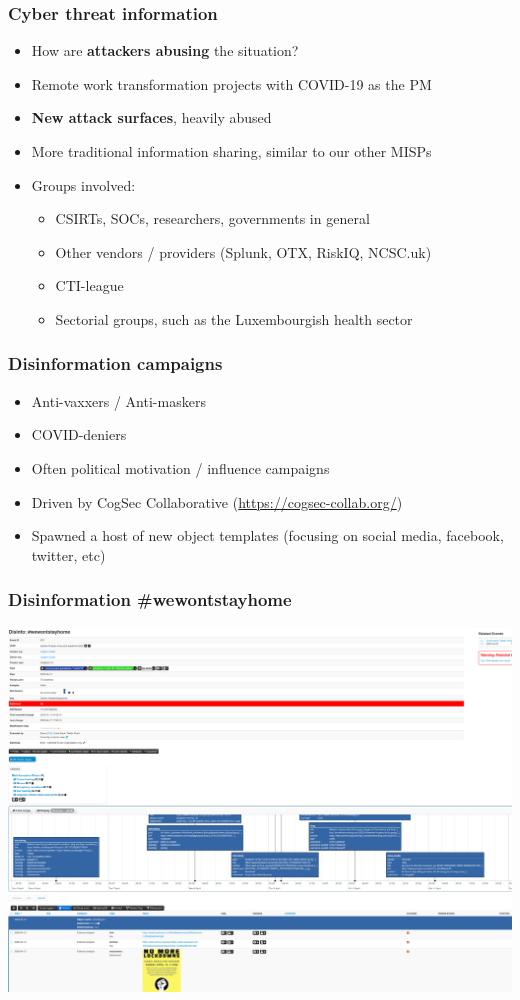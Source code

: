 \begin{frame}
 \frametitle{Cyber threat information}
 \begin{itemize}
         \item How are {\bf attackers abusing} the situation?
         \item Remote work transformation projects with COVID-19 as the PM
         \item {\bf New attack surfaces}, heavily abused
         \item More traditional information sharing, similar to our other MISPs
         \item Groups involved:
         \begin{itemize}
              \item CSIRTs, SOCs, researchers, governments in general
              \item Other vendors / providers (Splunk, OTX, RiskIQ, NCSC.uk)
              \item CTI-league
              \item Sectorial groups, such as the Luxembourgish health sector
         \end{itemize}
 \end{itemize}
\end{frame}

\begin{frame}
 \frametitle{Disinformation campaigns}
 \begin{itemize}
         \item Anti-vaxxers / Anti-maskers
         \item COVID-deniers
         \item Often political motivation / influence campaigns
         \item Driven by CogSec Collaborative (\url{https://cogsec-collab.org/})
         \item Spawned a host of new object templates (focusing on social media, facebook, twitter, etc)
 \end{itemize}
\end{frame}

\begin{frame}
    \frametitle{Disinformation \#wewontstayhome}
    \includegraphics[width=1.00\linewidth]{wewontstayhome.png}
\end{frame}

